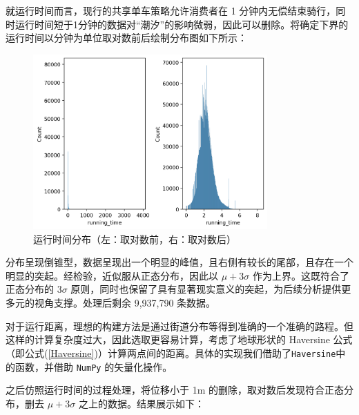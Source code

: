 \documentclass[12pt,a4paper,oneside]{ctexart}
\begin{document}
就运行时间而言，现行的共享单车策略允许消费者在 1 分钟内无偿结束骑行，同时运行时间短于1分钟的数据对“潮汐”的影响微弱，因此可以删除。将确定下界的运行时间以分钟为单位取对数前后绘制分布图如下所示：
\begin{figure}[H]
    \centering
    \includegraphics[width=0.8\textwidth]{Figs/运行时间分布图.png}
    \caption{运行时间分布（左：取对数前，右：取对数后）}
    \label{fig:运行时间分布}
\end{figure}


分布呈现倒锥型，数据呈现出一个明显的峰值，且右侧有较长的尾部，且存在一个明显的突起。经检验，近似服从正态分布，因此以 $\mu + 3\sigma$ 作为上界。这既符合了正态分布的 $3\sigma$ 原则，同时也保留了具有显著现实意义的突起，为后续分析提供更多元的视角支撑。处理后剩余 9,937,790 条数据。 

对于运行距离，理想的构建方法是通过街道分布等得到准确的一个准确的路程。但这样的计算复杂度过大，因此选取更容易计算，考虑了地球形状的 Haversine 公式（即公式(\ref{Haversine})）计算两点间的距离。具体的实现我们借助了\texttt{Haversine}中的函数，并借助 \texttt{NumPy} 的矢量化操作。

之后仿照运行时间的过程处理，将位移小于 1m 的删除，取对数后发现符合正态分布，删去 $\mu + 3\sigma$ 之上的数据。结果展示如下：
\end{document}
